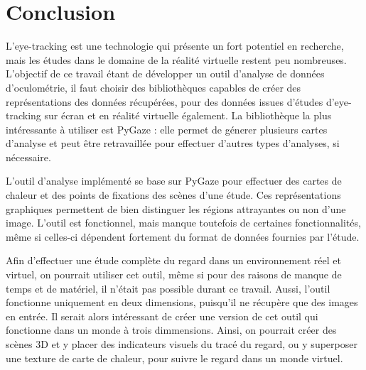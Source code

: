 \documentclass[hidelinks,12pt]{article}
\begin{document}

\section{Conclusion}

L'eye-tracking est une technologie qui présente un fort potentiel en recherche,
mais les études dans le domaine de la réalité virtuelle restent peu nombreuses.
L'objectif de ce travail étant de développer un outil d'analyse de données
d'oculométrie, il faut choisir des bibliothèques capables de créer des
représentations des données récupérées, pour des données issues d'études
d'eye-tracking sur écran et en réalité virtuelle également. La bibliothèque la
plus intéressante à utiliser est PyGaze : elle permet de génerer plusieurs
cartes d'analyse et peut être retravaillée pour effectuer d'autres types
d'analyses, si nécessaire.

\bigskip
L'outil d'analyse implémenté se base sur PyGaze pour effectuer des cartes de
chaleur et des points de fixations des scènes d'une étude. Ces représentations
graphiques permettent de bien distinguer les régions attrayantes ou non d'une
image. L'outil est fonctionnel, mais manque toutefois de certaines
fonctionnalités, même si celles-ci dépendent fortement du format de données
fournies par l'étude.

\bigskip
Afin d'effectuer une étude complète du regard dans un environnement réel et
virtuel, on pourrait utiliser cet outil, même si pour des raisons de manque
de temps et de matériel, il n'était pas possible durant ce travail. Aussi,
l'outil fonctionne uniquement en deux dimensions, puisqu'il ne récupère que des
images en entrée. Il serait alors intéressant de créer une version de cet
outil qui fonctionne dans un monde à trois dimmensions. Ainsi, on pourrait créer
des scènes 3D et y placer des indicateurs visuels du tracé du regard, ou y
superposer une texture de carte de chaleur, pour suivre le regard dans un monde
virtuel.




\end{document}
